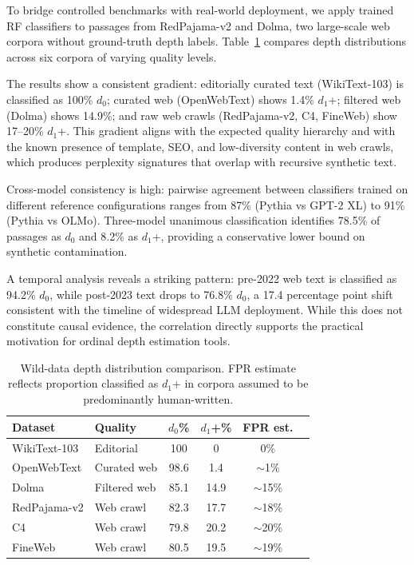 \documentclass[11pt,a4paper]{article}
\begin{document}
To bridge controlled benchmarks with real-world deployment, we apply trained RF classifiers to passages from RedPajama-v2 and Dolma, two large-scale web corpora without ground-truth depth labels. Table~\ref{tab:wild} compares depth distributions across six corpora of varying quality levels.

The results show a consistent gradient: editorially curated text (WikiText-103) is classified as 100\% $d_0$; curated web (OpenWebText) shows 1.4\% $d_1$+; filtered web (Dolma) shows 14.9\%; and raw web crawls (RedPajama-v2, C4, FineWeb) show 17--20\% $d_1$+. This gradient aligns with the expected quality hierarchy and with the known presence of template, SEO, and low-diversity content in web crawls, which produces perplexity signatures that overlap with recursive synthetic text.

Cross-model consistency is high: pairwise agreement between classifiers trained on different reference configurations ranges from 87\% (Pythia vs GPT-2 XL) to 91\% (Pythia vs OLMo). Three-model unanimous classification identifies 78.5\% of passages as $d_0$ and 8.2\% as $d_1$+, providing a conservative lower bound on synthetic contamination.

A temporal analysis reveals a striking pattern: pre-2022 web text is classified as 94.2\% $d_0$, while post-2023 text drops to 76.8\% $d_0$, a 17.4 percentage point shift consistent with the timeline of widespread LLM deployment. While this does not constitute causal evidence, the correlation directly supports the practical motivation for ordinal depth estimation tools.

\begin{table}[t]
\centering
\caption{Wild-data depth distribution comparison. FPR estimate reflects proportion classified as $d_1$+ in corpora assumed to be predominantly human-written.}
\label{tab:wild}
\small
\begin{tabular}{llcccc}
\toprule
\textbf{Dataset} & \textbf{Quality} & \textbf{$d_0$\%} & \textbf{$d_1$+\%} & \textbf{FPR est.} \\
\midrule
WikiText-103 & Editorial & 100 & 0 & 0\% \\
OpenWebText & Curated web & 98.6 & 1.4 & $\sim$1\% \\
Dolma & Filtered web & 85.1 & 14.9 & $\sim$15\% \\
RedPajama-v2 & Web crawl & 82.3 & 17.7 & $\sim$18\% \\
C4 & Web crawl & 79.8 & 20.2 & $\sim$20\% \\
FineWeb & Web crawl & 80.5 & 19.5 & $\sim$19\% \\
\bottomrule
\end{tabular}
\end{table}
\end{document}
